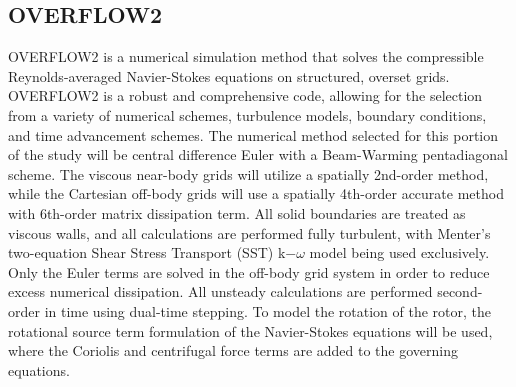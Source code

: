 \subsection{OVERFLOW2}\label{section5-3-1}
OVERFLOW2 is a numerical simulation method that solves the compressible Reynolds-averaged Navier-Stokes equations on structured, overset grids.\cite{buning2003,nichols2008} OVERFLOW2 is a robust and comprehensive code, allowing for the selection from a variety of numerical schemes, turbulence models, boundary conditions, and time advancement schemes.\cite{jespersen1997,nichols2006} The numerical method selected for this portion of the study will be central difference Euler with a Beam-Warming pentadiagonal scheme.\cite{beam1979} The viscous near-body grids will utilize a spatially 2nd-order method, while the Cartesian off-body grids will use a spatially 4th-order accurate method with 6th-order matrix dissipation term. All solid boundaries are treated as viscous walls, and all calculations are performed fully turbulent, with Menter's two-equation Shear Stress Transport (SST) k$-\omega$ model \cite{menter1994} being used exclusively. Only the Euler terms are solved in the off-body grid system in order to reduce excess numerical dissipation. All unsteady calculations are performed second-order in time using dual-time stepping.\cite{nichols2005} To model the rotation of the rotor, the rotational source term formulation of the Navier-Stokes equations will be used, where the Coriolis and centrifugal force terms are added to the governing equations.



